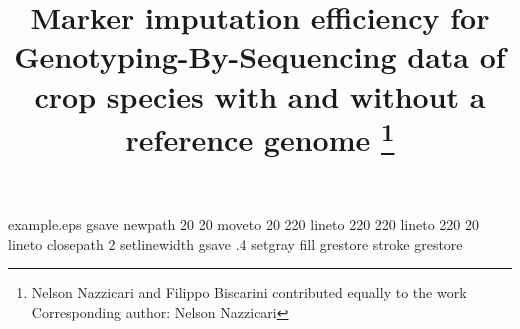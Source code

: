 %
%
%
%
%
\begin{filecontents*}{example.eps}
gsave
newpath
  20 20 moveto
  20 220 lineto
  220 220 lineto
  220 20 lineto
closepath
2 setlinewidth
gsave
  .4 setgray fill
grestore
stroke
grestore
\end{filecontents*}
%
\RequirePackage{fix-cm}
%
\documentclass[smallextended]{svjour3}       %
%
\smartqed  %
%
%
%

\usepackage{xfrac}   
\usepackage{lineno}  
\usepackage{graphicx}
\usepackage{color}
\usepackage{multirow}
\usepackage{array}
\usepackage{setspace} 
\usepackage{makecell}
\usepackage[nomarkers]{endfloat}

\newcolumntype{C}[1]{>{\centering\let\newline\\\arraybackslash\hspace{0pt}}m{#1}}

\linenumbers
\doublespacing %

%


\title{
Marker imputation efficiency for Genotyping-By-Sequencing data of crop
species with and without a reference genome 
\thanks{Nelson Nazzicari and Filippo Biscarini contributed equally to the work \\
Corresponding author: Nelson Nazzicari }
}

